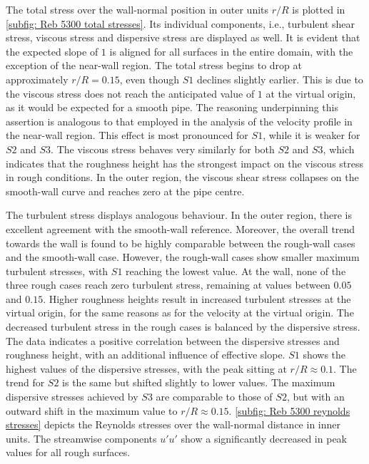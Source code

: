 The total stress over the wall-normal position in outer units $r/R$ is plotted in \autoref{subfig: Reb 5300 total stresses}. Its individual components, i.e., turbulent shear stress, viscous stress and dispersive stress are displayed as well.
It is evident  that the expected slope of $1$ is aligned for all surfaces in the entire domain, with the exception of the near-wall region. 
The total stress begins to drop at approximately $r/R = 0.15$, even though $S1$ declines slightly earlier.
This is due to the viscous stress does not reach the anticipated  value of $1$ at the virtual origin, as it would be expected for a smooth pipe.
The reasoning underpinning this assertion is analogous to that employed in the analysis of the velocity profile in the near-wall region.
This effect is most pronounced  for $S1$, while it is weaker for $S2$ and $S3$.
The viscous stress behaves very similarly for both $S2$ and $S3$, which indicates that the roughness height has the strongest impact on the viscous stress in rough conditions.
In the outer region, the viscous shear stress collapses on the smooth-wall curve and reaches zero at the pipe centre.

The turbulent stress displays analogous behaviour.
In the outer region, there is excellent agreement with the smooth-wall reference.
Moreover, the overall trend towards the wall is found to be highly comparable between  the rough-wall cases and the smooth-wall case.
However, the rough-wall cases show smaller maximum turbulent stresses, with $S1$ reaching the lowest value.
At the wall, none of the three rough cases reach zero turbulent stress, remaining at values between $0.05$ and $0.15$.
Higher roughness heights result in increased turbulent stresses at the virtual origin, for the same reasons as for the velocity at the virtual origin.
The decreased turbulent stress in the rough cases is balanced by the dispersive stress.
The data indicates  a positive correlation between the dispersive stresses and  roughness height, with an additional influence of effective slope.
$S1$ shows the highest values of the dispersive stresses, with the peak sitting at $r/R \approx 0.1$.
The trend for $S2$ is the same but shifted slightly to lower values.
 The maximum dispersive stresses  achieved by $S3$ are comparable to those of  $S2$, but with an outward shift in the maximum value to $r/R \approx 0.15$.
\autoref{subfig: Reb 5300 reynolds stresses} depicts the Reynolds stresses over the wall-normal distance in inner units.
The streamwise components $u'u'$ show a significantly decreased in peak values for all rough surfaces.


